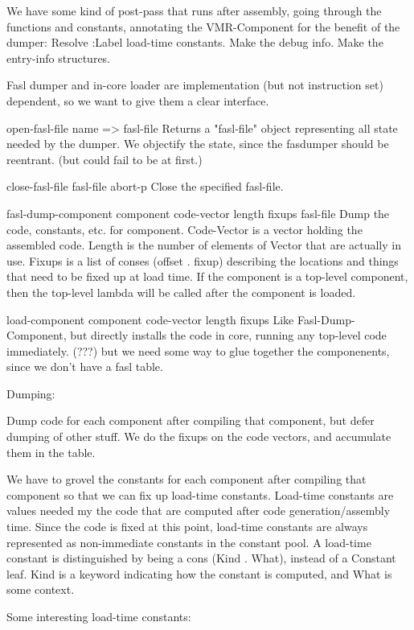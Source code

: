 We have some kind of post-pass that runs after assembly, going through the
functions and constants, annotating the VMR-Component for the benefit of the
dumper:
    Resolve :Label load-time constants.
    Make the debug info.
    Make the entry-info structures.

Fasl dumper and in-core loader are implementation (but not instruction set)
dependent, so we want to give them a clear interface.

open-fasl-file name => fasl-file
    Returns a "fasl-file" object representing all state needed by the dumper.
    We objectify the state, since the fasdumper should be reentrant.  (but
    could fail to be at first.)

close-fasl-file fasl-file abort-p
    Close the specified fasl-file.

fasl-dump-component component code-vector length fixups fasl-file
    Dump the code, constants, etc. for component.  Code-Vector is a vector
    holding the assembled code.  Length is the number of elements of Vector
    that are actually in use.  Fixups is a list of conses (offset . fixup)
    describing the locations and things that need to be fixed up at load time.
    If the component is a top-level component, then the top-level lambda will
    be called after the component is loaded.

load-component component code-vector length fixups
    Like Fasl-Dump-Component, but directly installs the code in core, running
    any top-level code immediately.  (???) but we need some way to glue
    together the componenents, since we don't have a fasl table.



Dumping:

Dump code for each component after compiling that component, but defer dumping
of other stuff.  We do the fixups on the code vectors, and accumulate them in
the table.

We have to grovel the constants for each component after compiling that
component so that we can fix up load-time constants.  Load-time constants are
values needed my the code that are computed after code generation/assembly
time.  Since the code is fixed at this point, load-time constants are always
represented as non-immediate constants in the constant pool.  A load-time
constant is distinguished by being a cons (Kind . What), instead of a Constant
leaf.  Kind is a keyword indicating how the constant is computed, and What is
some context.

Some interesting load-time constants:


